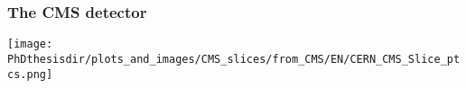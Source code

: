 \begin{frame}
\frametitle{The CMS detector}
\begin{center}
\texttt{[image: \\PhDthesisdir/plots\_and\_images/CMS\_slices/from\_CMS/EN/CERN\_CMS\_Slice\_ptcs.png]}
\end{center}
\end{frame}
